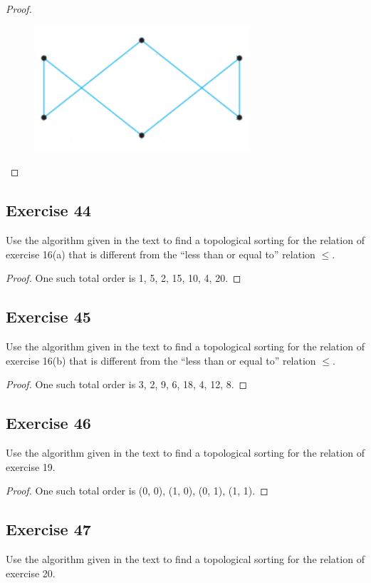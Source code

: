 \documentclass[14pt]{extarticle}
\begin{document}
\begin{proof}
\begin{figure}[ht!]
\centering
\includegraphics[scale=0.5]{../images/8.5.43.png}
\end{figure}
\end{proof}

\subsection{Exercise 44}
Use the algorithm given in the text to find a topological sorting for the relation of exercise 16(a) that is different from the “less than or equal to” relation \(\leq\).

\begin{proof}
One such total order is 1, 5, 2, 15, 10, 4, 20.
\end{proof}

\subsection{Exercise 45}
Use the algorithm given in the text to find a topological sorting for the relation of exercise 16(b) that is different from the “less than or equal to” relation \(\leq\).

\begin{proof}
One such total order is 3, 2, 9, 6, 18, 4, 12, 8.
\end{proof}

\subsection{Exercise 46}
Use the algorithm given in the text to find a topological sorting for the relation of exercise 19.

\begin{proof}
One such total order is (0, 0), (1, 0), (0, 1), (1, 1).
\end{proof}

\subsection{Exercise 47}
Use the algorithm given in the text to find a topological sorting for the relation of exercise 20.
\end{document}
